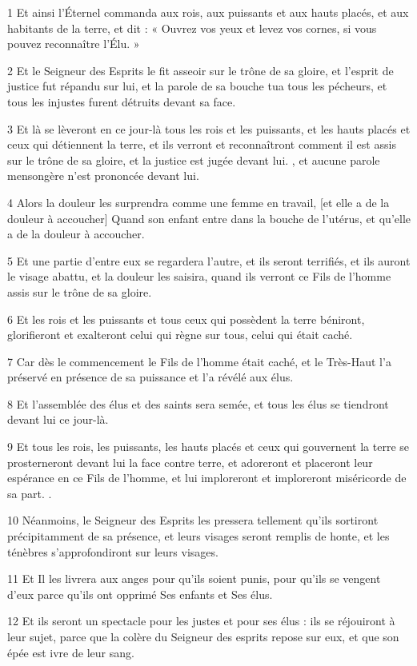 \par 1 Et ainsi l'Éternel commanda aux rois, aux puissants et aux hauts placés, et aux habitants de la terre, et dit : « Ouvrez vos yeux et levez vos cornes, si vous pouvez reconnaître l'Élu. »
\par 2 Et le Seigneur des Esprits le fit asseoir sur le trône de sa gloire, et l'esprit de justice fut répandu sur lui, et la parole de sa bouche tua tous les pécheurs, et tous les injustes furent détruits devant sa face.
\par 3 Et là se lèveront en ce jour-là tous les rois et les puissants, et les hauts placés et ceux qui détiennent la terre, et ils verront et reconnaîtront comment il est assis sur le trône de sa gloire, et la justice est jugée devant lui. , et aucune parole mensongère n'est prononcée devant lui.
\par 4 Alors la douleur les surprendra comme une femme en travail, [et elle a de la douleur à accoucher] Quand son enfant entre dans la bouche de l'utérus, et qu'elle a de la douleur à accoucher.
\par 5 Et une partie d'entre eux se regardera l'autre, et ils seront terrifiés, et ils auront le visage abattu, et la douleur les saisira, quand ils verront ce Fils de l'homme assis sur le trône de sa gloire.
\par 6 Et les rois et les puissants et tous ceux qui possèdent la terre béniront, glorifieront et exalteront celui qui règne sur tous, celui qui était caché.
\par 7 Car dès le commencement le Fils de l'homme était caché, et le Très-Haut l'a préservé en présence de sa puissance et l'a révélé aux élus.
\par 8 Et l'assemblée des élus et des saints sera semée, et tous les élus se tiendront devant lui ce jour-là.
\par 9 Et tous les rois, les puissants, les hauts placés et ceux qui gouvernent la terre se prosterneront devant lui la face contre terre, et adoreront et placeront leur espérance en ce Fils de l'homme, et lui imploreront et imploreront miséricorde de sa part. .
\par 10 Néanmoins, le Seigneur des Esprits les pressera tellement qu'ils sortiront précipitamment de sa présence, et leurs visages seront remplis de honte, et les ténèbres s'approfondiront sur leurs visages.
\par 11 Et Il les livrera aux anges pour qu'ils soient punis, pour qu'ils se vengent d'eux parce qu'ils ont opprimé Ses enfants et Ses élus.
\par 12 Et ils seront un spectacle pour les justes et pour ses élus : ils se réjouiront à leur sujet, parce que la colère du Seigneur des esprits repose sur eux, et que son épée est ivre de leur sang.
